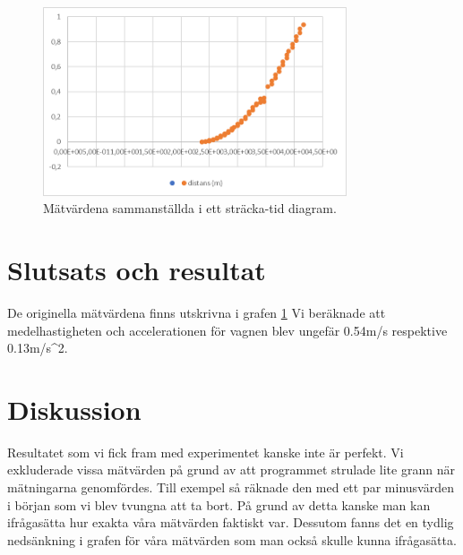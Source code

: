 \documentclass[11p, titlepage, oneside, a4paper]{article}
\begin{document}
    \begin{figure}[!h]
        \includegraphics[width=0.8\textwidth]{images/img_1.png}
        \caption{Mätvärdena sammanställda i ett sträcka-tid diagram.}
        \label{fig:graf1}
    \end{figure}
    
    \section{Slutsats och resultat}
    De originella mätvärdena finns utskrivna i grafen \ref{fig:graf1}
    Vi beräknade att medelhastigheten och accelerationen för vagnen blev ungefär 0.54m/s respektive 0.13m/s^2.
    \section{Diskussion} 
    Resultatet som vi fick fram med experimentet kanske inte är perfekt. Vi exkluderade vissa mätvärden på grund av att programmet strulade lite grann när mätningarna genomfördes. Till exempel så räknade den med ett par minusvärden i början som vi blev tvungna att ta bort. På grund av detta kanske man kan ifrågasätta hur exakta våra mätvärden faktiskt var. Dessutom fanns det en tydlig nedsänkning i grafen för våra mätvärden som man också skulle kunna ifrågasätta.

    
    \printbibliography
\end{document}
